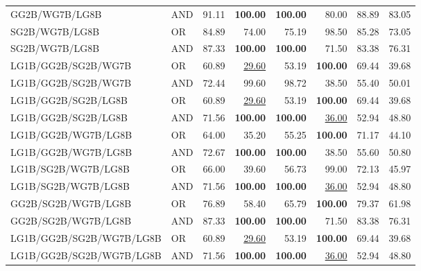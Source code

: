 \documentclass{article}
\begin{document}
{\begin{longtable}{llrrrrrr}
 GG2B/WG7B/LG8B           & AND     & 91.11             & \textbf{100.00}   & \textbf{100.00}   & 80.00             & 88.89             & 83.05            \\
 SG2B/WG7B/LG8B           & OR      & 84.89             & 74.00             & 75.19             & 98.50             & 85.28             & 73.05            \\
 SG2B/WG7B/LG8B           & AND     & 87.33             & \textbf{100.00}   & \textbf{100.00}   & 71.50             & 83.38             & 76.31            \\
 LG1B/GG2B/SG2B/WG7B      & OR      & 60.89             & \underline{29.60} & 53.19             & \textbf{100.00}   & 69.44             & 39.68            \\
 LG1B/GG2B/SG2B/WG7B      & AND     & 72.44             & 99.60             & 98.72             & 38.50             & 55.40             & 50.01            \\
 LG1B/GG2B/SG2B/LG8B      & OR      & 60.89             & \underline{29.60} & 53.19             & \textbf{100.00}   & 69.44             & 39.68            \\
 LG1B/GG2B/SG2B/LG8B      & AND     & 71.56             & \textbf{100.00}   & \textbf{100.00}   & \underline{36.00} & 52.94             & 48.80            \\
 LG1B/GG2B/WG7B/LG8B      & OR      & 64.00             & 35.20             & 55.25             & \textbf{100.00}   & 71.17             & 44.10            \\
 LG1B/GG2B/WG7B/LG8B      & AND     & 72.67             & \textbf{100.00}   & \textbf{100.00}   & 38.50             & 55.60             & 50.80            \\
 LG1B/SG2B/WG7B/LG8B      & OR      & 66.00             & 39.60             & 56.73             & 99.00             & 72.13             & 45.97            \\
 LG1B/SG2B/WG7B/LG8B      & AND     & 71.56             & \textbf{100.00}   & \textbf{100.00}   & \underline{36.00} & 52.94             & 48.80            \\
 GG2B/SG2B/WG7B/LG8B      & OR      & 76.89             & 58.40             & 65.79             & \textbf{100.00}   & 79.37             & 61.98            \\
 GG2B/SG2B/WG7B/LG8B      & AND     & 87.33             & \textbf{100.00}   & \textbf{100.00}   & 71.50             & 83.38             & 76.31            \\
 LG1B/GG2B/SG2B/WG7B/LG8B & OR      & 60.89             & \underline{29.60} & 53.19             & \textbf{100.00}   & 69.44             & 39.68            \\
 LG1B/GG2B/SG2B/WG7B/LG8B & AND     & 71.56             & \textbf{100.00}   & \textbf{100.00}   & \underline{36.00} & 52.94             & 48.80            \\

\end{longtable}
}
\end{document}
